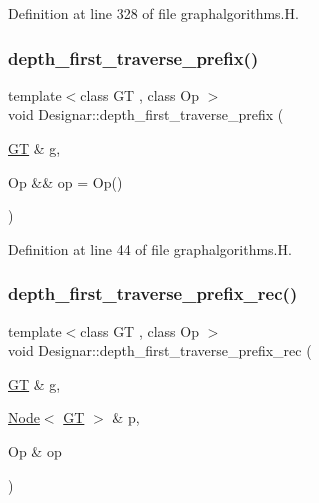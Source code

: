 Definition at line 328 of file graphalgorithms.\+H.

\mbox{\label{namespace_designar_afaa79311647a603f5c95d575f67ea767}} 
\subsubsection{\texorpdfstring{depth\+\_\+first\+\_\+traverse\+\_\+prefix()}{depth\_first\_traverse\_prefix()}\hspace{0.1cm}{\footnotesize\ttfamily [2/2]}}
{\footnotesize\ttfamily template$<$class GT , class Op $>$ \\
void Designar\+::depth\+\_\+first\+\_\+traverse\+\_\+prefix (\begin{DoxyParamCaption}\item[{\hyperlink{demo-buildgraph_8_c_a3001c40d2c31ca87ed96cd7d1334a55e}{GT} \&}]{g,  }\item[{Op \&\&}]{op = {\ttfamily Op()} }\end{DoxyParamCaption})}



Definition at line 44 of file graphalgorithms.\+H.

\mbox{\label{namespace_designar_a0b89964c32afcc315905100d3ae49ad6}} 
\subsubsection{\texorpdfstring{depth\+\_\+first\+\_\+traverse\+\_\+prefix\+\_\+rec()}{depth\_first\_traverse\_prefix\_rec()}}
{\footnotesize\ttfamily template$<$class GT , class Op $>$ \\
void Designar\+::depth\+\_\+first\+\_\+traverse\+\_\+prefix\+\_\+rec (\begin{DoxyParamCaption}\item[{\hyperlink{demo-buildgraph_8_c_a3001c40d2c31ca87ed96cd7d1334a55e}{GT} \&}]{g,  }\item[{\hyperlink{namespace_designar_a5af326c65aa2bd26b26c410f2030d09e}{Node}$<$ \hyperlink{demo-buildgraph_8_c_a3001c40d2c31ca87ed96cd7d1334a55e}{GT} $>$ \&}]{p,  }\item[{Op \&}]{op }\end{DoxyParamCaption})}



